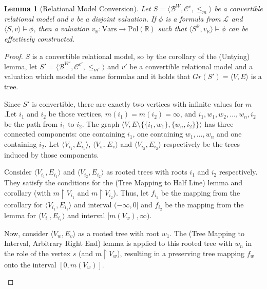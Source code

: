\documentclass{article}
\newtheorem*{lemma}{Lemma}
\newcommand{\R}{\mathbb{R}}
\newcommand{\B}{\mathcal{B}}
\newcommand{\lang}{\mathcal{L}}
\newcommand{\Vars}{\text{Vars}}
\newcommand{\Pol}{\text{Pol}}
\begin{document}
\begin{lemma}[Relational Model Conversion]
  Let $S = \langle \B^W, \mathcal{C}^c, \leq_m \rangle$ be a convertible relational model and $v$ be a disjoint valuation. If $\phi$ is a formula from $\lang$ and $\langle S, v \rangle \models \phi$, then a valuation $v_\R: \Vars \rightarrow \Pol(\R)$ such that $\langle S^\R, v_\R \rangle \models \phi$ can be effectively constructed.
\end{lemma}
\begin{proof}
  $S$ is a convertible relational model, so by the corollary of the (Untying) lemma, let $S' = \langle \B^{W'}, \mathcal{C}^{c'}, \leq_{m'} \rangle$ and $v'$ be a convertible relational model and a valuation which model the same formulas and it holds that $Gr(S') = \langle V, E \rangle$ is a tree.

  Since $S'$ is convertible, there are exactly two vertices with infinite values for $m$.Let $i_1$ and $i_2$ be those vertices, $m(i_1) = m(i_2) = \infty$, and $i_1, w_1, w_2, \dots, w_n, i_2$ be the path from $i_1$ to $i_2$. The graph $\langle V, E \setminus \{\{i_1, w_1\}, \{w_n, i_2\}\} \rangle$ has three connected components: one containing $i_1$, one containing $w_1, \dots, w_n$ and one containing $i_2$. Let $\langle V_{i_1}, E_{i_1} \rangle$, $\langle V_w, E_v \rangle$ and $\langle V_{i_2}, E_{i_2} \rangle$ respectively be the trees induced by those components.

  Consider $\langle V_{i_1}, E_{i_1} \rangle$ and $\langle V_{i_2}, E_{i_2} \rangle$ as rooted trees with roots $i_1$ and $i_2$ respectively. They satisfy the conditions for the (Tree Mapping to Half Line) lemma and corollary (with $m \restriction V_{i_1}$ and $m \restriction V_{i_2}$). Thus, let $f_{i_1}$ be the mapping from the corollary for $\langle V_{i_1}, E_{i_1} \rangle$ and interval $(-\infty, 0]$ and $f_{i_2}$ be the mapping from the lemma for $\langle V_{i_1}, E_{i_1} \rangle$ and interval $[m(V_w), \infty)$.

    Now, consider $\langle V_w, E_v \rangle$ as a rooted tree with root $w_1$. The (Tree Mapping to Interval, Arbitrary Right End) lemma is applied to this rooted tree with $w_n$ in the role of the vertex $s$ (and $m \restriction V_w$), resulting in a preserving tree mapping $f_w$ onto the interval $[0, m(V_w)]$.

    \begin{figure}[ht]
      \centering
\end{figure}
\end{proof}
\end{document}
